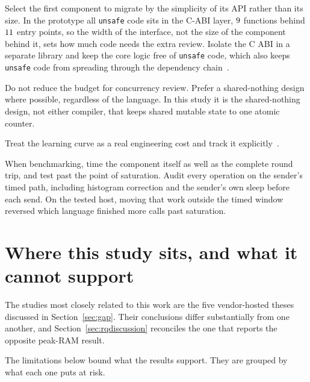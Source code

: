 \documentclass[english,oneside,a4paper,censored,csm,software-track-2020]{HYthesisML}
\begin{document}
\begin{compactitem}
\item Select the first component to migrate by the simplicity of its API rather
than its size. In the prototype all \texttt{unsafe} code sits in the C-ABI
layer, $9$ functions behind $11$ entry points, so the
width of the interface, not the size of the component behind it, sets how much
code needs the extra review. Isolate the C ABI in a separate library and keep
the core logic free of \texttt{unsafe} code, which also keeps \texttt{unsafe}
code from spreading through the dependency chain~\cite{evans2020rust}.

\item Do not reduce the budget for concurrency review. Prefer a shared-nothing
design where possible, regardless of the language. In this study it is the
shared-nothing design, not either compiler, that keeps shared mutable state to
one atomic counter.

\item Treat the learning curve as a real engineering cost and track it
explicitly~\cite{fulton2021adopting,crichton2024learning}.

\item When benchmarking, time the component itself as well as the complete
round trip, and test past the point of saturation. Audit every operation on the
sender's timed path, including histogram correction and the sender's own sleep before
each send. On the tested host, moving
that work outside the timed window reversed which language finished more calls
past saturation.
\end{compactitem}

\section[Where this study sits]{Where this study sits, and what it cannot support}\label{sec:standing}
The studies most closely related to this work are the five vendor-hosted theses
discussed in Section~\ref{sec:gap}. Their conclusions differ substantially from
one another, and Section~\ref{sec:rqdiscussion} reconciles the one that reports
the opposite peak-RAM result.

The limitations below bound what the results support. They are grouped by what
each one puts at risk.
\end{document}

